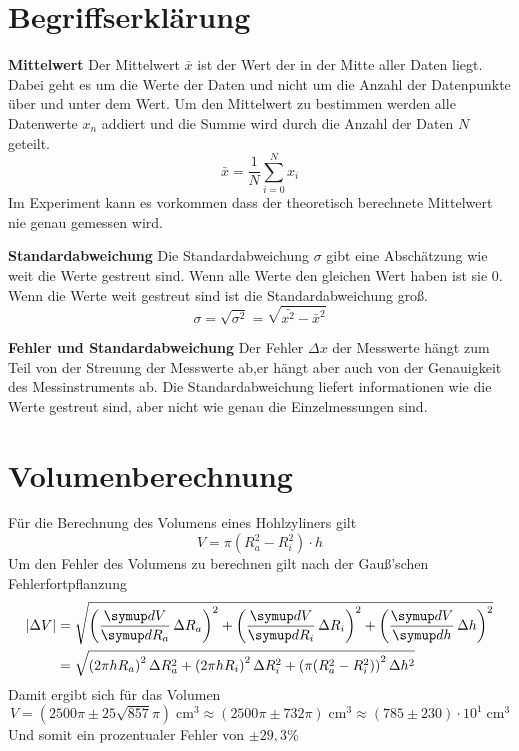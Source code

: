 \documentclass[titlepage = firstcover]{scrartcl}
\begin{document}
\section{Begriffserklärung}
\begin{description}
\item{\textbf{Mittelwert}} \newline
    Der Mittelwert $\bar{x}$ ist der Wert der in der Mitte aller Daten liegt. Dabei geht es um die Werte der Daten und nicht um die Anzahl der Datenpunkte über und unter dem Wert. Um den Mittelwert zu bestimmen werden alle Datenwerte $x_n$ addiert und die Summe wird durch die Anzahl der Daten $N$ geteilt.
    \begin{equation}
        \bar{x} = \frac{1}{N} \sum \limits_{i=0}^{N}x_i
    \end{equation}
    Im Experiment kann es vorkommen dass der theoretisch berechnete Mittelwert nie genau gemessen wird.
\item{\textbf{Standardabweichung}} \newline
    Die Standardabweichung $\sigma$ gibt eine Abschätzung wie weit die Werte gestreut sind. Wenn alle Werte den gleichen Wert haben ist sie 0. Wenn die Werte weit gestreut sind ist die Standardabweichung groß.
    \begin{equation}
        \sigma = \sqrt{\sigma^2} = \sqrt{\bar{x^2}-\bar{x}^2}
    \end{equation}
\item{\textbf{Fehler und Standardabweichung}} \newline
    Der Fehler $\Delta x$ der Messwerte hängt zum Teil von der Streuung der Messwerte ab,er hängt aber auch von der Genauigkeit des Messinstruments ab. Die Standardabweichung liefert informationen wie die Werte gestreut sind, aber nicht wie genau die Einzelmessungen sind.
\end{description} 

\section{Volumenberechnung}
Für die Berechnung des Volumens eines Hohlzyliners gilt 
\begin{equation*}
    V = \pi (R_a^2 - R_i^2) \cdot h
\end{equation*}
Um den Fehler des Volumens zu berechnen gilt nach der Gauß'schen Fehlerfortpflanzung
\begin{align*}
    |\Delta V|&= \sqrt{ \left( \dif{V}{R_a} \Delta R_a \right)^2 + \left( \dif{V}{R_i} \Delta R_i \right)^2  + \left( \dif{V}{h} \Delta h \right)^2 } \\
              &= \sqrt{ \left( 2\pi h R_a  \right)^2 \Delta R_a^2 + \left( 2\pi h R_i \right)^2 \Delta R_i ^2 + \left( \pi (R_a^2 - R_i^2 )\right)^2 \Delta h^2 }
\end{align*}
Damit ergibt sich für das Volumen
\begin{equation*}
    V = \left(2500\pi \pm 25\sqrt{857}\pi\right) \; \text{cm}^3 ≈  \left(2500\pi \pm 732 \pi\right) \; \text{cm}^3 ≈  \left(785 \pm 230\right)\cdot 10^{1} \; \text{cm}^3
\end{equation*}
Und somit ein prozentualer Fehler von $\pm 29,3\%$
\end{document}
